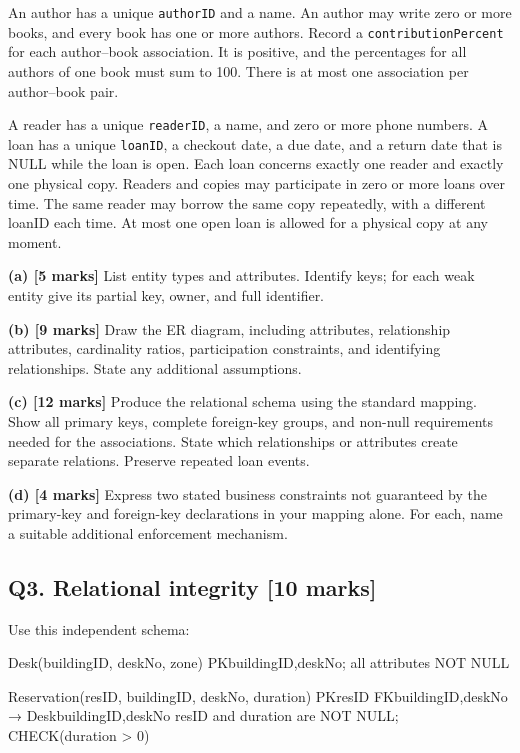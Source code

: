 An author has a unique \texttt{authorID} and a name. An author may write zero or more books, and every book has one or more authors. Record a \texttt{contributionPercent} for each author--book association. It is positive, and the percentages for all authors of one book must sum to 100. There is at most one association per author--book pair.

A reader has a unique \texttt{readerID}, a name, and zero or more phone numbers. A loan has a unique \texttt{loanID}, a checkout date, a due date, and a return date that is NULL while the loan is open. Each loan concerns exactly one reader and exactly one physical copy. Readers and copies may participate in zero or more loans over time. The same reader may borrow the same copy repeatedly, with a different loanID each time. At most one open loan is allowed for a physical copy at any moment.

\textbf{(a) {[}5 marks{]}} List entity types and attributes. Identify keys; for each weak entity give its partial key, owner, and full identifier.

\textbf{(b) {[}9 marks{]}} Draw the ER diagram, including attributes, relationship attributes, cardinality ratios, participation constraints, and identifying relationships. State any additional assumptions.

\textbf{(c) {[}12 marks{]}} Produce the relational schema using the standard mapping. Show all primary keys, complete foreign-key groups, and non-null requirements needed for the associations. State which relationships or attributes create separate relations. Preserve repeated loan events.

\textbf{(d) {[}4 marks{]}} Express two stated business constraints not guaranteed by the primary-key and foreign-key declarations in your mapping alone. For each, name a suitable additional enforcement mechanism.

\subsection{Q3. Relational integrity {[}10 marks{]}}\label{practice_paper_2-q3.-relational-integrity-10-marks}

Use this independent schema:

\begin{StudyCode}
Desk(buildingID, deskNo, zone)
  PK{buildingID,deskNo}; all attributes NOT NULL

Reservation(resID, buildingID, deskNo, duration)
  PK{resID}
  FK{buildingID,deskNo} → Desk{buildingID,deskNo}
  resID and duration are NOT NULL; CHECK(duration > 0)
\end{StudyCode}

